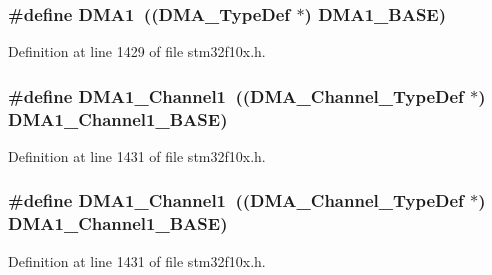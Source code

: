 \subsubsection[{\texorpdfstring{D\+M\+A1}{DMA1}}]{\setlength{\rightskip}{0pt plus 5cm}\#define D\+M\+A1~(({\bf D\+M\+A\+\_\+\+Type\+Def} $\ast$) {\bf D\+M\+A1\+\_\+\+B\+A\+SE})}\hypertarget{group___peripheral__declaration_gacc16d2a5937f7585320a98f7f6b578f9}{}\label{group___peripheral__declaration_gacc16d2a5937f7585320a98f7f6b578f9}


Definition at line 1429 of file stm32f10x.\+h.

\subsubsection[{\texorpdfstring{D\+M\+A1\+\_\+\+Channel1}{DMA1_Channel1}}]{\setlength{\rightskip}{0pt plus 5cm}\#define D\+M\+A1\+\_\+\+Channel1~(({\bf D\+M\+A\+\_\+\+Channel\+\_\+\+Type\+Def} $\ast$) {\bf D\+M\+A1\+\_\+\+Channel1\+\_\+\+B\+A\+SE})}\hypertarget{group___peripheral__declaration_gac83c5be824be1c02716e2522e80ddf7a}{}\label{group___peripheral__declaration_gac83c5be824be1c02716e2522e80ddf7a}


Definition at line 1431 of file stm32f10x.\+h.

\subsubsection[{\texorpdfstring{D\+M\+A1\+\_\+\+Channel1}{DMA1_Channel1}}]{\setlength{\rightskip}{0pt plus 5cm}\#define D\+M\+A1\+\_\+\+Channel1~(({\bf D\+M\+A\+\_\+\+Channel\+\_\+\+Type\+Def} $\ast$) {\bf D\+M\+A1\+\_\+\+Channel1\+\_\+\+B\+A\+SE})}\hypertarget{group___peripheral__declaration_gac83c5be824be1c02716e2522e80ddf7a}{}\label{group___peripheral__declaration_gac83c5be824be1c02716e2522e80ddf7a}


Definition at line 1431 of file stm32f10x.\+h.

